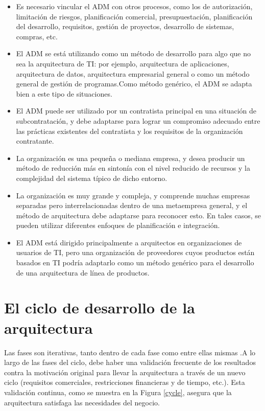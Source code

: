 \begin{itemize}
\item Es necesario vincular el ADM con otros procesos, como los de autorización, limitación de riesgos, planificación comercial, presupuestación, planificación del desarrollo, requisitos, gestión de proyectos, desarrollo de sistemas, compras, etc.

\item El ADM se está utilizando como un método de desarrollo para algo que no sea la arquitectura de TI: por ejemplo, arquitectura de aplicaciones, arquitectura de datos, arquitectura empresarial general o como un método general de gestión de programas.Como método genérico, el ADM se adapta bien a este tipo de situaciones.

\item El ADM puede ser utilizado por un contratista principal en una situación de subcontratación, y debe adaptarse para lograr un compromiso adecuado entre las prácticas existentes del contratista y los requisitos de la organización contratante.

\item La organización es una pequeña o mediana empresa, y desea producir un método de reducción más en sintonía con el nivel reducido de recursos y la complejidad del sistema típico de dicho entorno.

\item La organización es muy grande y compleja, y comprende muchas empresas separadas pero interrelacionadas dentro de una metaempresa general, y el método de arquitectura debe adaptarse para reconocer esto. En tales casos, se pueden utilizar diferentes enfoques de planificación e integración.

\item El ADM está dirigido principalmente a arquitectos en organizaciones de usuarios de TI, pero una organización de proveedores cuyos productos están basados en TI podría adaptarlo como un método genérico para el desarrollo de una arquitectura de línea de productos.

\end{itemize}

\newpage
\section{El ciclo de desarrollo de la arquitectura}

Las fases son iterativas, tanto dentro de cada fase como entre ellas mismas .A lo largo de las fases del ciclo, debe haber una validación frecuente de los resultados contra la motivación original para llevar la arquitectura a través de un nuevo ciclo (requisitos comerciales, restricciones financieras y de tiempo, etc.). Esta validación continua, como se muestra en la Figura \ref{cycle}, asegura que la arquitectura satisfaga las necesidades del negocio.

